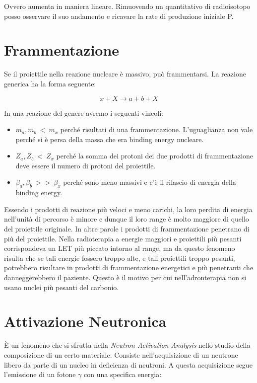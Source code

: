 Ovvero aumenta in maniera lineare. Rimuovendo un quantitativo di radioisotopo posso osservare il suo andamento e ricavare la rate di produzione iniziale P.

\section{Frammentazione}

Se il proiettile nella reazione nucleare è massivo, può frammentarsi. La reazione generica ha la forma seguente:

\begin{equation}
x+X \longrightarrow a+b+X
\end{equation}

In una reazione del genere avremo i seguenti vincoli:

\begin{itemize}
\item $m_a, m_b  \ < \ m_x$ perché risultati di una frammentazione. L'uguaglianza non vale perché si è persa della massa che era binding energy nucleare.
\item $Z_a, Z_b \ < \ Z_x$ perché la somma dei protoni dei due prodotti di frammentazione deve essere il numero di protoni del proiettile.
\item $\beta_a, \beta_b \ >> \ \beta_x$ perché sono meno massivi e c'è il rilascio di energia della binding energy.
\end{itemize}

Essendo i prodotti di reazione più veloci e meno carichi, la loro perdita di energia nell'unità di percorso è minore e dunque il loro range è molto maggiore di quello del proiettile originale. 
In altre parole i prodotti di frammentazione penetrano di più del proiettile.
Nella radioterapia a energie maggiori e proiettili più pesanti corrispondeva un LET più piccato intorno al range, ma da questo fenomeno risulta che se tali energie fossero troppo alte, e tali proiettili troppo pesanti, potrebbero risultare in prodotti di frammentazione energetici e più penetranti che danneggerebbero il paziente. Questo è il motivo per cui nell'adronterapia non si usano nuclei più pesanti del carbonio.

\section{Attivazione Neutronica}
\`E un fenomeno che si sfrutta nella \emph{Neutron Activation Analysis} nello studio della composizione di un certo materiale. Consiste nell'acquisizione di un neutrone libero da parte di un nucleo in deficienza di neutroni. A questa acquisizione segue l'emissione di un fotone $\gamma$ con una specifica energia:


